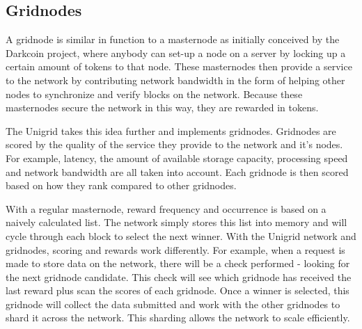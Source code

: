 \documentclass{article}
\begin{document}
\subsection{Gridnodes}
A gridnode is similar in function to a masternode as initially conceived by the Darkcoin project, where anybody can set-up a node on a server by locking up a certain amount of tokens to that node. These masternodes then provide a service to the network by contributing network bandwidth in the form of helping other nodes to synchronize and verify blocks on the network. Because these masternodes secure the network in this way, they are rewarded in tokens.

The Unigrid takes this idea further and implements gridnodes. Gridnodes are scored by the quality of the service they provide to the network and it's nodes. For example, latency, the amount of available storage capacity, processing speed and network bandwidth are all taken into account. Each gridnode is then scored based on how they rank compared to other gridnodes.

With a regular masternode, reward frequency and occurrence is based on a naively calculated list. The network simply stores this list into memory and will cycle through each block to select the next winner. With the Unigrid network and gridnodes, scoring and rewards work differently. For example, when a request is made to store data on the network, there will be a check performed - looking for the next gridnode candidate. This check will see which gridnode has received the last reward plus scan the scores of each gridnode. Once a winner is selected, this gridnode will collect the data submitted and work with the other gridnodes to shard it across the network. This sharding allows the network to scale efficiently.
\end{document}

